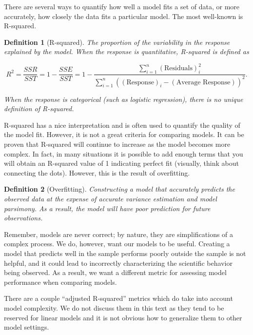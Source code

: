 \documentclass[
]{book}
\theoremstyle{plain}
\theoremstyle{mydefn}
\newtheorem{definition}{Definition}[chapter]
\theoremstyle{myexmpl}
\theoremstyle{remark}
\begin{document}
There are several ways to quantify how well a model fits a set of data, or more accurately, how closely the data fits a particular model. The most well-known is R-squared.

\begin{definition}[R-squared]
The proportion of the variability in the response explained by the model. When the response is quantitative, R-squared is defined as

\[R^2 = \frac{SSR}{SST} = 1 - \frac{SSE}{SST} = 1 - \frac{\sum_{i=1}^{n} (\text{Residuals})_i^2}{\sum_{i=1}^{n} \left((\text{Response})_i - (\text{Average Response})\right)^2}.\]

When the response is categorical (such as logistic regression), there is no unique definition of R-squared.
\end{definition}

R-squared has a nice interpretation and is often used to quantify the quality of the model fit. However, it is not a great criteria for comparing models. It can be proven that R-squared will continue to increase as the model becomes more complex. In fact, in many situations it is possible to add enough terms that you will obtain an R-squared value of 1 indicating perfect fit (visually, think about connecting the dots). However, this is the result of overfitting.

\begin{definition}[Overfitting]
Constructing a model that accurately predicts the observed data at the expense of accurate variance estimation and model parsimony. As a result, the model will have poor prediction for future observations.
\end{definition}

Remember, models are never correct; by nature, they are simplifications of a complex process. We do, however, want our models to be useful. Creating a model that predicts well in the sample performs poorly outside the sample is not helpful, and it could lead to incorrectly characterizing the scientific behavior being observed. As a result, we want a different metric for assessing model performance when comparing models.

\begin{rmdtip}
There are a couple ``adjusted R-squared'' metrics which do take into account model complexity. We do not discuss them in this text as they tend to be reserved for linear models and it is not obvious how to generalize them to other model settings.
\end{rmdtip}
\end{document}
